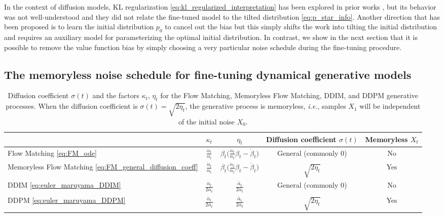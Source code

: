 \documentclass[]{fairmeta}
\makeatletter
\newcommand*{\ie}{{\it i.e.}\@\xspace}
\makeatother
\begin{document}
In the context of diffusion models, KL regularization \eqref{eq:kl_regularized_interpretation} has been explored in prior works \citep{fan2024reinforcement}, but its behavior was not well-understood and they did not relate the fine-tuned model to the tilted distribution \eqref{eq:p_star_info}. Another direction that has been proposed is to learn the initial distribution $p_0$ to cancel out the bias \citep{uehara2024finetuning,tang2024finetuning} but this simply shifts the work into tilting the initial distribution and requires an auxiliary model for parameterizing the optimal initial distribution. 
In contrast, we show in the next section that it is possible to remove the value function bias by simply choosing a very particular noise schedule during the fine-tuning procedure. 

\subsection{The memoryless noise schedule for fine-tuning dynamical generative models} \label{sec:memoryless_schedule}

\begin{table}
\centering
\begin{tabular}{lcccc}
    \toprule
     & $\kappa_t$ & $\eta_t$ & Diffusion coefficient $\sigma(t)$ & Memoryless $X_t$ \\
    \midrule
    \addlinespace
    Flow Matching \eqref{eq:FM_ode} & $\frac{\dot{\alpha}_t}{\alpha_t}$ & $\beta_t \big(\frac{\dot{\alpha}_t}{\alpha_t} \beta_t - \dot{\beta}_t\big)$ & General (commonly $0$) & No \\
    \addlinespace
    Memoryless Flow Matching \eqref{eq:FM_general_diffusion_coeff} & $\frac{\dot{\alpha}_t}{\alpha_t}$ & $\beta_t \big(\frac{\dot{\alpha}_t}{\alpha_t} \beta_t - \dot{\beta}_t\big)$ & $\sqrt{2\eta_t}$ & Yes \\
    \addlinespace
    DDIM \eqref{eq:euler_maruyama_DDIM} & 
    $\frac{\dot{\bar{\alpha}}_{t}}{2\bar{\alpha}_{t}}$
    & 
    $\frac{\dot{\bar{\alpha}}_{t}}{2\bar{\alpha}_{t}}$
    & General (commonly $0$) & No \\
    \addlinespace
    DDPM \eqref{eq:euler_maruyama_DDPM} & 
    $\frac{\dot{\bar{\alpha}}_{t}}{2\bar{\alpha}_{t}}$
    & 
    $\frac{\dot{\bar{\alpha}}_{t}}{2\bar{\alpha}_{t}}$
    & $\sqrt{2\eta_t}$ & Yes \\
    \bottomrule
\end{tabular}
\caption{Diffusion coefficient $\sigma(t)$ and the factors $\kappa_t$, $\eta_t$ for the Flow Matching, Memoryless Flow Matching, DDIM, and DDPM generative processes. When the diffusion coefficient is $\sigma(t) = \sqrt{2\eta_t}$, the generative process is memoryless, \ie, samples $X_1$ will be independent of the initial noise $X_0$.}
\label{tab:coefficients}
\end{table} 
\end{document}
